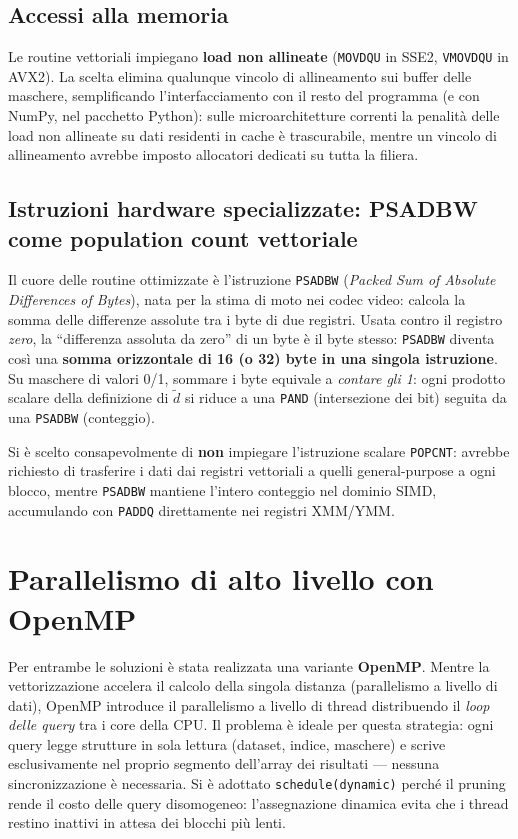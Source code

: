 \subsection{Accessi alla memoria}
Le routine vettoriali impiegano \textbf{load non allineate} (\texttt{MOVDQU} in SSE2, \texttt{VMOVDQU} in AVX2). La scelta elimina qualunque vincolo di allineamento sui buffer delle maschere, semplificando l'interfacciamento con il resto del programma (e con NumPy, nel pacchetto Python): sulle microarchitetture correnti la penalità delle load non allineate su dati residenti in cache è trascurabile, mentre un vincolo di allineamento avrebbe imposto allocatori dedicati su tutta la filiera.

\subsection{Istruzioni hardware specializzate: PSADBW come population count vettoriale}
Il cuore delle routine ottimizzate è l'istruzione \texttt{PSADBW} (\textit{Packed Sum of Absolute Differences of Bytes}), nata per la stima di moto nei codec video: calcola la somma delle differenze assolute tra i byte di due registri. Usata contro il registro \emph{zero}, la ``differenza assoluta da zero'' di un byte è il byte stesso: \texttt{PSADBW} diventa così una \textbf{somma orizzontale di 16 (o 32) byte in una singola istruzione}. Su maschere di valori 0/1, sommare i byte equivale a \emph{contare gli 1}: ogni prodotto scalare della definizione di $\tilde{d}$ si riduce a una \texttt{PAND} (intersezione dei bit) seguita da una \texttt{PSADBW} (conteggio).

Si è scelto consapevolmente di \textbf{non} impiegare l'istruzione scalare \texttt{POPCNT}: avrebbe richiesto di trasferire i dati dai registri vettoriali a quelli general-purpose a ogni blocco, mentre \texttt{PSADBW} mantiene l'intero conteggio nel dominio SIMD, accumulando con \texttt{PADDQ} direttamente nei registri XMM/YMM.

\section{Parallelismo di alto livello con OpenMP}
Per entrambe le soluzioni è stata realizzata una variante \textbf{OpenMP}. Mentre la vettorizzazione accelera il calcolo della singola distanza (parallelismo a livello di dati), OpenMP introduce il parallelismo a livello di thread distribuendo il \emph{loop delle query} tra i core della CPU. Il problema è ideale per questa strategia: ogni query legge strutture in sola lettura (dataset, indice, maschere) e scrive esclusivamente nel proprio segmento dell'array dei risultati — nessuna sincronizzazione è necessaria. Si è adottato \texttt{schedule(dynamic)} perché il pruning rende il costo delle query disomogeneo: l'assegnazione dinamica evita che i thread restino inattivi in attesa dei blocchi più lenti.

